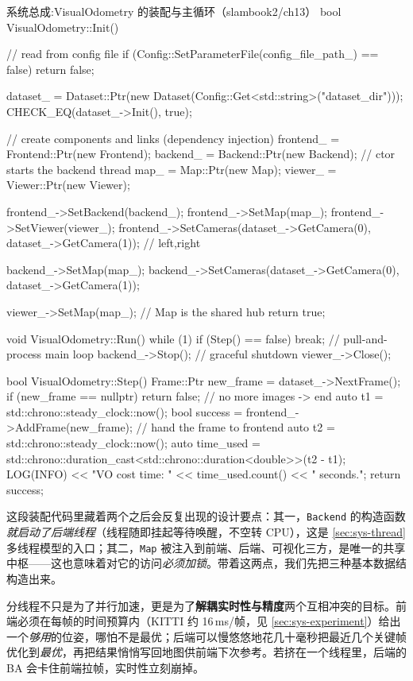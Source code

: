 \begin{codebox}[C++]{系统总成:VisualOdometry 的装配与主循环（slambook2/ch13）}
bool VisualOdometry::Init() {
    // read from config file
    if (Config::SetParameterFile(config_file_path_) == false) return false;

    dataset_ = Dataset::Ptr(new Dataset(Config::Get<std::string>("dataset_dir")));
    CHECK_EQ(dataset_->Init(), true);

    // create components and links (dependency injection)
    frontend_ = Frontend::Ptr(new Frontend);
    backend_  = Backend::Ptr(new Backend);     // ctor starts the backend thread
    map_      = Map::Ptr(new Map);
    viewer_   = Viewer::Ptr(new Viewer);

    frontend_->SetBackend(backend_);
    frontend_->SetMap(map_);
    frontend_->SetViewer(viewer_);
    frontend_->SetCameras(dataset_->GetCamera(0), dataset_->GetCamera(1)); // left,right

    backend_->SetMap(map_);
    backend_->SetCameras(dataset_->GetCamera(0), dataset_->GetCamera(1));

    viewer_->SetMap(map_);                      // Map is the shared hub
    return true;
}

void VisualOdometry::Run() {
    while (1) { if (Step() == false) break; }   // pull-and-process main loop
    backend_->Stop();                           // graceful shutdown
    viewer_->Close();
}

bool VisualOdometry::Step() {
    Frame::Ptr new_frame = dataset_->NextFrame();
    if (new_frame == nullptr) return false;     // no more images -> end
    auto t1 = std::chrono::steady_clock::now();
    bool success = frontend_->AddFrame(new_frame);  // hand the frame to frontend
    auto t2 = std::chrono::steady_clock::now();
    auto time_used =
        std::chrono::duration_cast<std::chrono::duration<double>>(t2 - t1);
    LOG(INFO) << "VO cost time: " << time_used.count() << " seconds.";
    return success;
}
\end{codebox}

\noindent 这段装配代码里藏着两个之后会反复出现的设计要点：其一，\texttt{Backend} 的构造函数\emph{就启动了后端线程}（线程随即挂起等待唤醒，不空转 CPU），这是 \cref{sec:sys-thread} 多线程模型的入口；其二，\texttt{Map} 被注入到前端、后端、可视化三方，是唯一的共享中枢——这也意味着对它的访问\emph{必须加锁}。带着这两点，我们先把三种基本数据结构造出来。

\begin{pitfall}
分线程不只是为了并行加速，更是为了\textbf{解耦实时性与精度}两个互相冲突的目标。前端必须在每帧的时间预算内（KITTI 约 16\,ms/帧，见 \cref{sec:sys-experiment}）给出一个\emph{够用}的位姿，哪怕不是最优；后端可以慢悠悠地花几十毫秒把最近几个关键帧优化到\emph{最优}，再把结果悄悄写回地图供前端下次参考。若挤在一个线程里，后端的 BA 会卡住前端拉帧，实时性立刻崩掉。
\end{pitfall}

